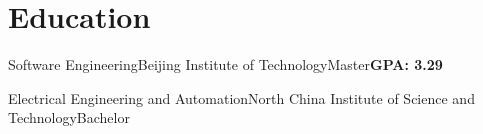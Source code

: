 

\section{Education}

{
}

{Software Engineering}{Beijing Institute of Technology}{Master}{\textbf{GPA: 3.29}}
{
}

{Electrical Engineering and Automation}{North China Institute of Science and Technology}{Bachelor}{}
{
}
